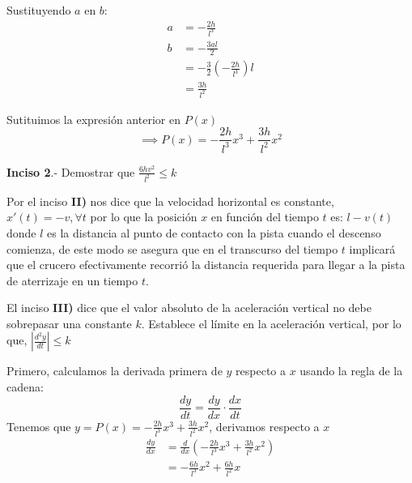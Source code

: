 Sustituyendo $a$ en $b$:
\begin{align*}
	a & = -\frac{2h}{l^3}                           \\
	b & = -\frac{3al}{2}                            \\
	  & = -\frac{3}{2}\left(-\frac{2h}{l^3}\right)l \\
	  & = \frac{3h}{l^2}
\end{align*}

Sutituimos la expresión anterior en $P(x)$
$$\implies P(x) = -\frac{2h}{l^3}x^3 + \frac{3h}{l^2}x^2$$

\textbf{Inciso 2}.- Demostrar que $\frac{6hv^2}{l^2} \leq k$

Por el inciso \textbf{II)} nos dice que la velocidad horizontal es constante, $x'(t)=-v, \forall t$ por lo que la posición $x$ en función del tiempo $t$ es: $l-v(t)$ donde $l$ es la distancia al punto de contacto con la pista cuando el descenso comienza, de este modo se asegura que en el transcurso del tiempo $t$ implicará que el crucero efectivamente recorrió la distancia requerida para llegar a la pista de aterrizaje en un tiempo $t$.

El inciso \textbf{III)} dice que el valor absoluto de la aceleración vertical no debe sobrepasar una constante $k$. Establece el límite en la aceleración vertical, por lo que, $\left|\frac{d^2 y}{dt}\right|\leq k$

Primero, calculamos la derivada primera de $y$ respecto a $x$ usando la regla de la cadena:
$$\frac{dy}{dt} = \frac{dy}{dx} \cdot \frac{dx}{dt}$$
Tenemos que $y = P(x) = -\frac{2h}{l^3} x^3 + \frac{3h}{l^2} x^2$, derivamos respecto a $x$
\begin{align*}
	\frac{dy}{dx} & = \frac{d}{dx} \left(-\frac{2h}{l^3} x^3 + \frac{3h}{l^2} x^2 \right) \\
	              & = -\frac{6h}{l^3} x^2 + \frac{6h}{l^2} x
\end{align*}

